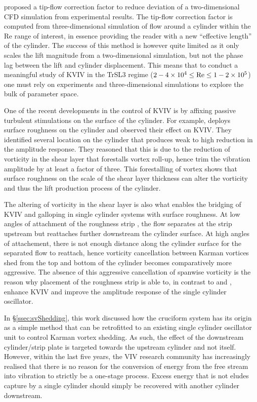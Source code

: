 \documentclass[oneside]{utmthesis}
\begin{document}
\citet{Kinaci2016} proposed a tip-flow correction factor to reduce deviation of a two-dimensional CFD simulation from experimental results. The tip-flow correction factor is computed from three-dimensional simulation of flow around a cylinder within the Re range of interest, in essence providing the reader with a new ``effective length'' of the cylinder. The success of this method is however quite limited as it only scales the lift magnitude from a two-dimensional simulation, but not the phase lag between the lift and cylinder displacement. This means that to conduct a meaningful study of KVIV in the TrSL3 regime ($2 - 4 \times 10^{4} \leq \text{Re} \leq 1 - 2 \times 10^{5}$) one must rely on experiments and three-dimensional simulations to explore the bulk of parameter space.

One of the recent developments in the control of KVIV is by affixing passive turbulent stimulations on the surface of the cylinder. For example, \citet{Park2016} deploys surface roughness on the cylinder and observed their effect on KVIV. They identified several location on the cylinder that produces weak to high reduction in the amplitude response. They reasoned that this is due to the reduction of vorticity in the shear layer that forestalls vortex roll-up, hence trim the vibration amplitude by at least a factor of three. This forestalling of vortex shows that surface roughness on the scale of the shear layer thickness can alter the vorticity and thus the lift production process of the cylinder.

The altering of vorticity in the shear layer is also what enables the bridging of KVIV and galloping in single cylinder systems with surface roughness. At low angles of attachment of the roughness strip \citep{Chang2011,Park2013}, the flow separates at the strip upstream but reattaches further downstream the cylinder surface. At high angles of attachement, there is not enough distance along the cylinder surface for the separated flow to reattach, hence vorticity cancellation between Karman vortices shed from the top and bottom of the cylinder becomes comparatively more aggressive. The absence of this aggressive cancellation of spanwise vorticity is the reason why placement of the roughness strip is able to, in contrast to \citet{Bernitsas2008c} and \citet{Park2016}, enhance KVIV and improve the amplitude response of the single cylinder oscillator.

In \S\ref{ssec:svShedding}, this work discussed how the cruciform system has its origin as a simple method that can be retrofitted to an existing single cylinder oscillator unit to control Karman vortex shedding. As such, the effect of the downstream cylinder/strip plate is targeted towards the upstream cylinder and not itself. However, within the last five years, the VIV research community has increasingly realised that there is no reason for the conversion of energy from the free stream into vibration to strictly be a one-stage process. Excess energy that is not eludes capture by a single cylinder should simply be recovered with another cylinder downstream.
\end{document}
